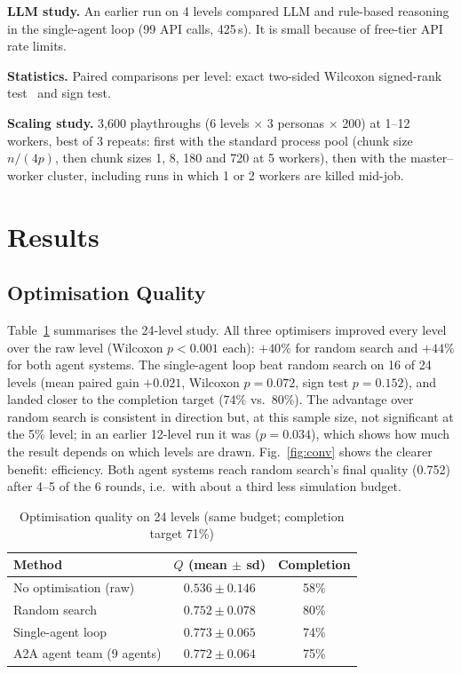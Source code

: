 \documentclass[conference]{IEEEtran}
\begin{document}
\textbf{LLM study.} An earlier run on 4 levels compared LLM and rule-based reasoning in the
single-agent loop (99 API calls, 425\,s). It is small because of free-tier API rate limits.

\textbf{Statistics.} Paired comparisons per level: exact two-sided Wilcoxon signed-rank
test~\cite{wilcoxon1945} and sign test.

\textbf{Scaling study.} 3,600 playthroughs (6 levels $\times$ 3 personas $\times$ 200) at 1--12
workers, best of 3 repeats: first with the standard process pool (chunk size $n/(4p)$, then chunk
sizes 1, 8, 180 and 720 at 5 workers), then with the master--worker cluster, including runs in which
1 or 2 workers are killed mid-job.

\section{Results}
\label{sec:results}
\subsection{Optimisation Quality}
Table~\ref{tab:main} summarises the 24-level study. All three optimisers improved every level over
the raw level (Wilcoxon $p<0.001$ each): $+40\%$ for random search and $+44\%$ for both agent
systems. The single-agent loop beat random search on 16 of 24 levels (mean paired gain $+0.021$,
Wilcoxon $p=0.072$, sign test $p=0.152$), and landed closer to the completion target (74\% vs.\
80\%). The advantage over random search is consistent in direction but, at this sample size, not
significant at the 5\% level; in an earlier 12-level run it was ($p=0.034$), which shows how much the
result depends on which levels are drawn. Fig.~\ref{fig:conv} shows the clearer benefit:
efficiency. Both agent systems reach random search's final quality (0.752) after 4--5 of the 6
rounds, i.e.\ with about a third less simulation budget.

\begin{table}[t]
\caption{Optimisation quality on 24 levels (same budget; completion target 71\%)}
\label{tab:main}
\centering
\footnotesize
\begin{tabular}{@{}lcc@{}}
\toprule
Method & $Q$ (mean $\pm$ sd) & Completion \\
\midrule
No optimisation (raw) & $0.536 \pm 0.146$ & 58\% \\
Random search & $0.752 \pm 0.078$ & 80\% \\
Single-agent loop & $\mathbf{0.773 \pm 0.065}$ & 74\% \\
A2A agent team (9 agents) & $0.772 \pm 0.064$ & 75\% \\
\bottomrule
\end{tabular}
\end{table}
\end{document}
